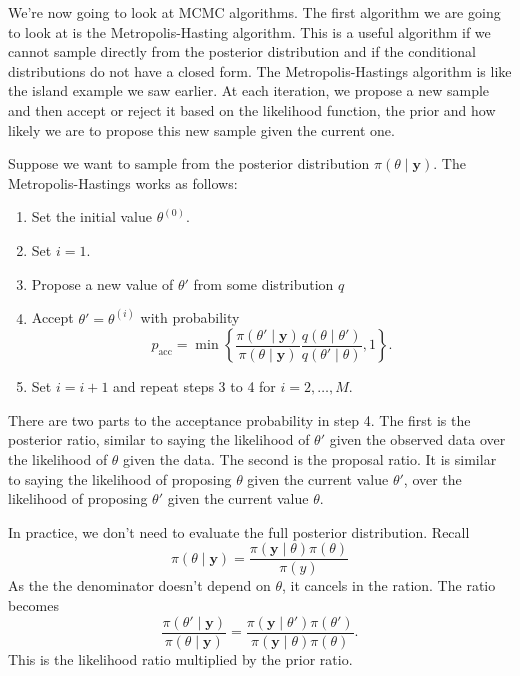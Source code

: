 \documentclass[
]{book}
\theoremstyle{definition}
\theoremstyle{definition}
\theoremstyle{definition}
\theoremstyle{definition}
\theoremstyle{remark}
\begin{document}
We're now going to look at MCMC algorithms. The first algorithm we are going to look at is the Metropolis-Hasting algorithm. This is a useful algorithm if we cannot sample directly from the posterior distribution and if the conditional distributions do not have a closed form. The Metropolis-Hastings algorithm is like the island example we saw earlier. At each iteration, we propose a new sample and then accept or reject it based on the likelihood function, the prior and how likely we are to propose this new sample given the current one.

Suppose we want to sample from the posterior distribution \(\pi(\theta \mid \boldsymbol{y})\). The Metropolis-Hastings works as follows:

\begin{enumerate}
\def\labelenumi{\arabic{enumi}.}
\item
  Set the initial value \(\theta^{(0)}\).
\item
  Set \(i = 1\).
\item
  Propose a new value of \(\theta'\) from some distribution \(q\)
\item
  Accept \(\theta' = \theta^{(i)}\) with probability
  \[
  p_{\textrm{acc}} = \min\left\{\frac{\pi(\theta' \mid \boldsymbol{y})}{\pi(\theta \mid \boldsymbol{y})}\frac{q(\theta \mid \theta')}{q(\theta' \mid \theta)}, 1\right\}.
  \]
\item
  Set \(i = i+1\) and repeat steps 3 to 4 for \(i = 2, \ldots, M\).
\end{enumerate}

There are two parts to the acceptance probability in step 4. The first is the posterior ratio, similar to saying the likelihood of \(\theta'\) given the observed data over the likelihood of \(\theta\) given the data. The second is the proposal ratio. It is similar to saying the likelihood of proposing \(\theta\) given the current value \(\theta'\), over the likelihood of proposing \(\theta'\) given the current value \(\theta\).

In practice, we don't need to evaluate the full posterior distribution. Recall
\[
\pi(\theta \mid \boldsymbol{y}) = \frac{\pi(\boldsymbol{y} \mid \theta) \pi(\theta)}{\pi(y)}
\]
As the the denominator doesn't depend on \(\theta\), it cancels in the ration. The ratio becomes
\[
\frac{\pi(\theta' \mid \boldsymbol{y})}{\pi(\theta \mid \boldsymbol{y})} = \frac{\pi(\boldsymbol{y} \mid \theta') \pi(\theta')}{\pi(\boldsymbol{y} \mid \theta) \pi(\theta)}.
\]
This is the likelihood ratio multiplied by the prior ratio.
\end{document}
